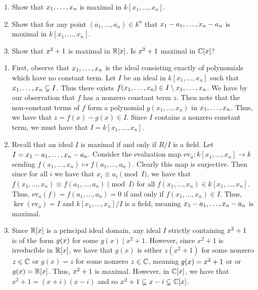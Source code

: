 \documentclass[letterpaper, 11pt, oneside]{book}
\begin{document}
\begin{exercise}\label{ex:UAG_1.1.9}
  \begin{enumerate}[label= (\alph*)]
    \item Show that $\ideal{x_{1}, \ldots, x_{n}}$ is maximal in $k[x_{1}, \ldots, x_{n}]$.
    \item Show that for any point $(a_{1}, \ldots, a_{n}) \in k^{n}$ that $\ideal{x_{1} - a_{1}, \ldots, x_{n} - a_{n}}$ is maximal in $k[x_{1}, \ldots, x_{n}]$.
    \item Show that $\ideal{x^{2} + 1}$ is maximal in $\mathbb{R}[x]$.
          Is $\ideal{x^{2} + 1}$ maximal in $\mathbb{C}[x]$?
  \end{enumerate}
\end{exercise}
\begin{pf}
  \begin{enumerate}[label= (\alph*)]
    \item First, observe that $\ideal{x_{1}, \ldots, x_{n}}$ is the ideal consisting exactly of polynomials which have no constant term.
          Let $I$ be an ideal in $k[x_{1}, \ldots, x_{n}]$ such that $\ideal{x_{1}, \ldots, x_{n}} \subsetneq I$.
          Thus there exists $f(x_{1}, \ldots, x_{n}) \in I \setminus \ideal{x_{1}, \ldots, x_{n}}$.
          We have by our observation that $f$ has a nonzero constant term $z$.
          Then note that the non-constant terms of $f$ form a polynomial $g(x_{1}, \ldots, x_{n})$ in $\ideal{x_{1}, \ldots, x_{n}}$.
          Thus, we have that $z = f(x) - g(x) \in I$.
          Since $I$ contains a nonzero constant term, we must have that $I = k[x_{1}, \ldots, x_{n}]$.
    \item Recall that an ideal $I$ is maximal if and only if $R/I$ is a field.
          Let $I = \ideal{x_{1} - a_{1}, \ldots, x_{n} - a_{n}}$.
          Consider the evaluation map $\text{ev}_{\overline{a}}\colon k[x_{1}, \ldots, x_{n}] \to k$ sending $f(x_{1}, \ldots, x_{n}) \mapsto f(a_{1}, \ldots, a_{n})$.
          Clearly this map is surjective.
          Then since for all $i$ we have that $x_{i} \equiv a_{i} \pmod{I}$, we have that $f(x_{1}, \ldots, x_{n}) \equiv f(a_{1}, \ldots, a_{n}) \pmod{I}$ for all $f(x_{1}, \ldots, x_{n}) \in k[x_{1}, \ldots, x_{n}]$.
          Thus, $\text{ev}_{\overline{a}}(f) = f(a_{1}, \ldots, a_{n}) = 0$ if and only if $f(x_{1}, \ldots, x_{n}) \in I$.
          Thus, $\ker(\text{ev}_{\overline{a}}) = I$ and $k[x_{1}, \ldots, x_{n}] / I$ is a field, meaning $\ideal{x_{1} - a_{1}, \ldots, x_{n} - a_{n}}$ is maximal.
    \item Since $\mathbb{R}[x]$ is a principal ideal domain, any ideal $I$ strictly containing $\ideal{x^{2} + 1}$ is of the form $\ideal{g(x)}$ for some $g(x) \mid x^{2} + 1$.
          However, since $x^{2} + 1$ is irreducible in $\mathbb{R}[x]$, we have that $g(x)$ is either $z(x^{2} + 1)$ for some nonzero $z \in \mathbb{C}$ or $g(x) = z$ for some nonzero $z \in \mathbb{C}$, meaning $\ideal{g(x)} = \ideal{x^{2} + 1}$ or or $\ideal{g(x)} = \R[x]$.
          Thus, $\ideal{x^{2} + 1}$ is maximal.
          However, in $\mathbb{C}[x]$, we have that $x^{2} + 1 = (x + i)(x - i)$ and so $\ideal{x^{2} + 1} \subsetneq \ideal{x - i} \subsetneq \C[x]$.
  \end{enumerate}
\end{pf}
\end{document}
